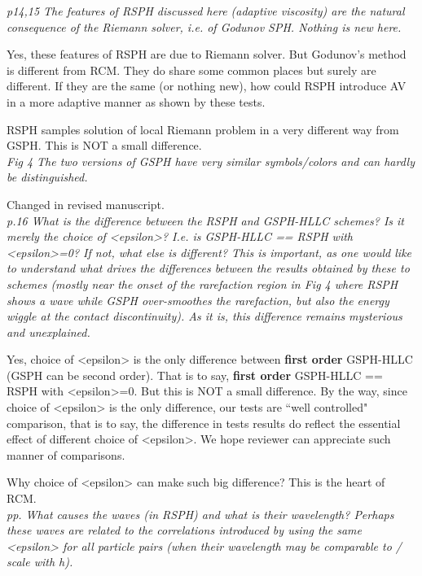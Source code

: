 \documentclass[10pt,a4paper]{article}
\begin{document}
\textit{p14,15 The features of RSPH discussed here (adaptive viscosity) are the
natural consequence of the Riemann solver, i.e. of Godunov SPH. Nothing
is new here.}

Yes, these features of RSPH are due to Riemann solver. 
But Godunov's method is different from RCM.
They do share some common places but surely are different. If they are the same (or nothing new), how could RSPH introduce AV in a more adaptive manner as shown by these tests.

RSPH samples solution of local Riemann problem in a very different way from GSPH. This is NOT a small difference.
\\[3pt]

\textit{Fig 4 The two versions of GSPH have very similar symbols/colors and can hardly be distinguished.}

Changed in revised manuscript. 
\\[3pt]

\textit{p.16 What is the difference between the RSPH and GSPH-HLLC schemes? Is it
merely the choice of <epsilon>? I.e. is GSPH-HLLC == RSPH with <epsilon>=0? If not, what else is different? This is important, as one would like to understand what drives the differences between the results obtained by these to schemes (mostly near
the onset of the rarefaction region in Fig 4 where RSPH shows a wave while GSPH over-smoothes the rarefaction, but also the energy wiggle at
the contact discontinuity). As it is, this difference remains mysterious and unexplained.}

Yes, choice of <epsilon> is the only difference between \textbf{first order} GSPH-HLLC (GSPH can be second order). That is to say, \textbf{first order} GSPH-HLLC == RSPH with <epsilon>=0.
But this is NOT a small difference.
By the way, since choice of <epsilon> is the only difference, our tests are ``well controlled" comparison, that is to say, the difference in tests results do reflect the essential effect of different choice of <epsilon>. We hope reviewer can appreciate such manner of comparisons.

Why choice of <epsilon> can make such big difference? This is the heart of RCM.
\\[3pt]

\textit{pp. What causes the waves (in RSPH) and what is their wavelength? Perhaps
these waves are related to the correlations introduced by using the same
<epsilon> for all particle pairs (when their wavelength may be comparable
to / scale with h).}
\end{document}
